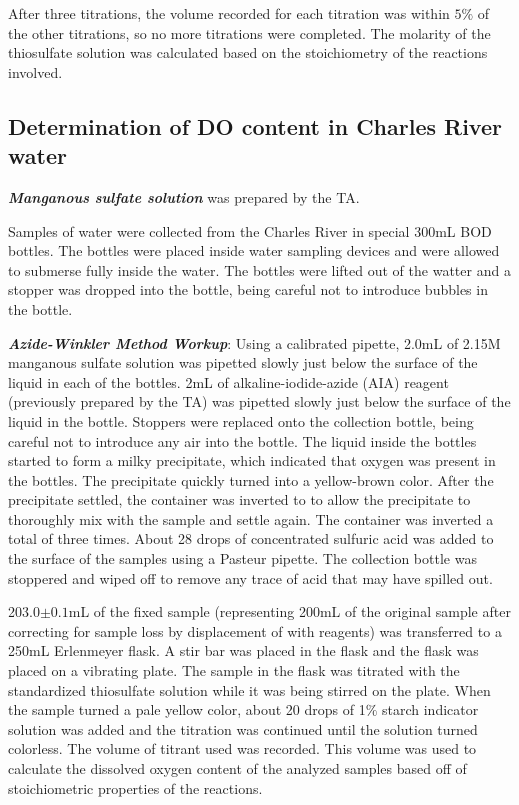 After three titrations, the volume recorded for each titration was within $5\%$ of the other titrations, so no more titrations were completed. The molarity of the thiosulfate solution was calculated based on the stoichiometry of the reactions involved.

\subsection{Determination of DO content in Charles River water}
\emph{\textbf{Manganous sulfate solution}} was prepared by the TA. 

Samples of water were collected from the Charles River in special 300mL BOD bottles. The bottles were placed inside water sampling devices and were allowed to submerse fully inside the water. The bottles were lifted out of the watter and a stopper was dropped into the bottle, being careful not to introduce bubbles in the bottle. 

\emph{\textbf{Azide-Winkler Method Workup}}: Using a calibrated pipette, 2.0mL of 2.15M manganous sulfate solution was pipetted slowly just below the surface of the liquid in each of the bottles. 2mL of alkaline-iodide-azide (AIA) reagent (previously prepared by the TA) was pipetted slowly just below the surface of the liquid in the bottle. Stoppers were replaced onto the collection bottle, being careful not to introduce any air into the bottle. The liquid inside the bottles started to form a milky precipitate, which indicated that oxygen was present in the bottles. The precipitate quickly turned into a yellow-brown color.  After the precipitate settled, the container was inverted to to allow the precipitate to thoroughly mix with the sample and settle again. The container was inverted a total of three times. About 28 drops of concentrated sulfuric acid was added to the surface of the samples using a Pasteur pipette. The collection bottle was stoppered and wiped off to remove any trace of acid that may have spilled out. 

203.0$\pm0.1$mL of the fixed sample (representing 200mL of the original sample after correcting for sample loss by displacement of with reagents) was transferred to a 250mL Erlenmeyer flask. A stir bar was placed in the flask and the flask was placed on a vibrating plate. The sample in the flask was titrated with the standardized thiosulfate solution while it was being stirred on the plate. When the sample turned a pale yellow color, about 20 drops of 1$\%$ starch indicator solution was added and the titration was continued until the solution turned colorless. The volume of titrant used was recorded. This volume was used to calculate the dissolved oxygen content of the analyzed samples based off of stoichiometric properties of the reactions. 

